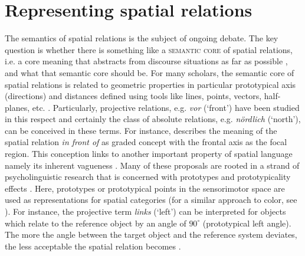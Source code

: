 \section{Representing spatial relations}
The semantics of spatial relations is the subject of ongoing debate. The 
key question is whether there is something like a 
\textsc{semantic core}  of 
spatial relations, i.e. a core meaning that 
abstracts from discourse situations as far as possible 
\citep{tenbrink2007space}, and what that 
semantic core should be. For many scholars, the semantic core of spatial 
relations is related to geometric 
properties \citep{herskovits1986language,eschenbach1999geometric,tenbrink2007space}
in particular prototypical axis (directions) and distances defined using tools 
like lines, points, vectors, half-planes, etc. \citep{levinson1996language}. 
Particularly, projective relations, e.g. \textit{vor} (`front') have been studied 
in this respect and certainly the class of absolute relations, e.g. \textit{n\"ordlich} 
(`north'), can be conceived in these terms. For instance, 
\cite{herskovits1986language}  describes the meaning 
of the spatial relation \textit{in front of} as graded concept with the frontal 
axis as the focal region. This conception links to another important property
of spatial language namely its inherent vagueness 
\citep{hall2008quantifying}.
Many of these proposals are rooted in a strand of psycholinguistic research that is concerned with
prototypes and prototypicality effects \citep{rosch1978principle}. 
Here, prototypes or prototypical points in the sensorimotor
space are used as representations for spatial categories
(for a similar approach to color, see \citealp{bleys2010phd}). 
For instance, the projective term \textit{links} (`left') can 
be interpreted for objects which relate to the reference object
by an angle of $90^\circ$ (prototypical left angle). The more the angle 
between the target object and the reference system deviates,
the less acceptable the spatial relation becomes \citep{tenbrink2005identifying,herskovits1986language,gapp1995angle}. 

